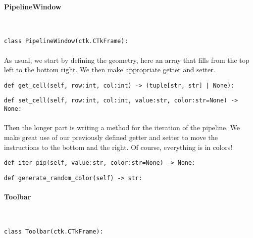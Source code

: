 \documentclass{article}
\newcommand{\subsubsubsection}[1]{\paragraph{#1}\mbox{}\\}
\begin{document}
\paragraph{}
\subsubsubsection{PipelineWindow}
\begin{lstlisting}[language=MyPython]
class PipelineWindow(ctk.CTkFrame):
\end{lstlisting}
\paragraph{}

As usual, we start by defining the geometry, here an array that fills from the top left to the bottom right. We then make appropriate getter and setter. \\

\begin{lstlisting}[language=MyPython]
def get_cell(self, row:int, col:int) -> (tuple[str, str] | None):
\end{lstlisting}
\begin{lstlisting}[language=MyPython]
def set_cell(self, row:int, col:int, value:str, color:str=None) -> None:
\end{lstlisting}
\paragraph{}

Then the longer part is writing a method for the iteration of the pipeline. We make great use of our previously defined getter and setter to move the instructions to the bottom and the right. Of course, everything is in colors! \\

\begin{lstlisting}[language=MyPython]
def iter_pip(self, value:str, color:str=None) -> None:
\end{lstlisting}
\begin{lstlisting}[language=MyPython]
def generate_random_color(self) -> str:
\end{lstlisting}
\paragraph{}
\subsubsubsection{Toolbar}
\begin{lstlisting}[language=MyPython]
class Toolbar(ctk.CTkFrame):
\end{lstlisting}
\paragraph{}
\end{document}
